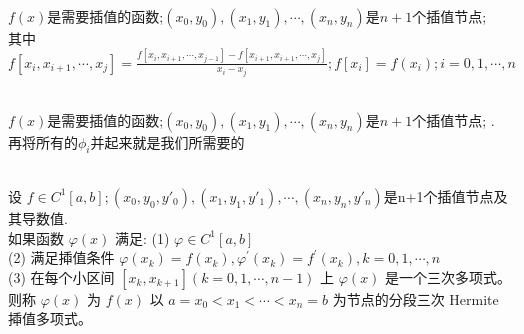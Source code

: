 \documentclass[12pt, a4paper, oneside]{ctexart}
\begin{document}
{\color{red}{$Newton$插值原理:}}\\
{{$f(x)$是需要插值的函数;$(x_0,y_0),(x_1,y_1),\cdots,(x_n,y_n)$是$n+1$个插值节点}};
\\
其中$f[x_i,x_{i+1},\cdots,x_j]=\frac{f[x_i,x_{i+1},\cdots,x_{j-1}]-f[x_{i+1},x_{i+1},\cdots,x_j]}{x_i-x_j};f[x_i]=f(x_i);i=0,1,\cdots,n$
\vspace*{10pt}

{\color{red}{$Piecewise-Linear$分段线性插值原理:}}\\
{{$f(x)$是需要插值的函数;$(x_0,y_0),(x_1,y_1),\cdots,(x_n,y_n)$是$n+1$个插值节点}};
.
再将所有的$\phi_i$并起来就是我们所需要的
\vspace*{10pt}

{\color{red}{$Piecewise-Hermite$分段$Hermite$插值原理:}}\\
设 $f \in C^1[a, b];(x_0,y_0,y'_0),(x_1,y_1,y'_1),\cdots,(x_n,y_n,y'_n)$是n+1个插值节点及其导数值.\\
如果函数 $\varphi(x)$ 满足:
(1) $\varphi \in C^1[a, b]$\\
(2) 满足揷值条件 $\varphi\left(x_k\right)=f\left(x_k\right),  \varphi^{\prime}\left(x_k\right)=f^{\prime}\left(x_k\right),k = 0,1,\cdots,n$\\
(3) 在每个小区间 $\left[x_k, x_{k+1}\right](k=0,1, \cdots, n-1)$ 上 $\varphi(x)$ 是一个三次多项式。 则称 $\varphi(x)$ 为 $f(x)$ 以 $a=x_0<x_1<\cdots<x_n=b$ 为节点的分段三次 Hermite 揷值多项式。
\pagebreak
\end{document}
